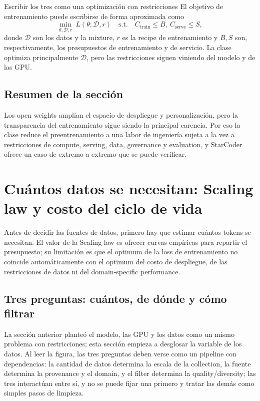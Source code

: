 \documentclass[a4paper]{article}
\begin{document}
\begin{knowledgebox}{Escribir los tres como una optimización con restricciones}
El objetivo de entrenamiento puede escribirse de forma aproximada como
\[
\min_{\theta,\mathcal{D},r}\ L(\theta;\mathcal{D},r)
\quad\text{s.t.}\quad
C_{\text{train}}\le B,\ C_{\text{serve}}\le S,
\]
donde $\mathcal{D}$ son los datos y la mixture, $r$ es la recipe de entrenamiento y $B,S$ son, respectivamente, los presupuestos de entrenamiento y de servicio. La clase optimiza principalmente $\mathcal{D}$, pero las restricciones siguen viniendo del modelo y de las GPU.
\end{knowledgebox}


\subsection{Resumen de la sección}

Los open weights amplían el espacio de despliegue y personalización, pero la transparencia del entrenamiento sigue siendo la principal carencia. Por eso la clase reduce el preentrenamiento a una labor de ingeniería sujeta a la vez a restricciones de compute, serving, data, governance y evaluation, y StarCoder ofrece un caso de extremo a extremo que se puede verificar.
\section{Cuántos datos se necesitan: Scaling law y costo del ciclo de vida}

Antes de decidir las fuentes de datos, primero hay que estimar cuántos tokens se necesitan. El valor de la Scaling law es ofrecer curvas empíricas para repartir el presupuesto; su limitación es que el optimum de la loss de entrenamiento no coincide automáticamente con el optimum del costo de despliegue, de las restricciones de datos ni del domain-specific performance.

\subsection{Tres preguntas: cuántos, de dónde y cómo filtrar}

La sección anterior planteó el modelo, las GPU y los datos como un mismo problema con restricciones; esta sección empieza a desglosar la variable de los datos. Al leer la figura, las tres preguntas deben verse como un pipeline con dependencias: la cantidad de datos determina la escala de la collection, la fuente determina la provenance y el domain, y el filter determina la quality/diversity; las tres interactúan entre sí, y no se puede fijar una primero y tratar las demás como simples pasos de limpieza.
\end{document}
